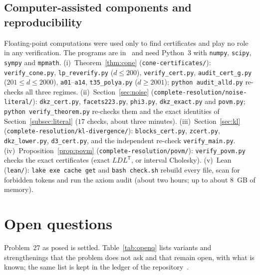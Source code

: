 \documentclass[11pt]{article}
\theoremstyle{remark}
\numberwithin{equation}{section}
\begin{document}
\subsection{Computer-assisted components and reproducibility}\label{subsec:computer}
\begin{sloppypar}
Floating-point computations were used only to find certificates and play no role in any verification. The programs are
in~\cite{repo} and need Python~3 with \texttt{numpy}, \texttt{scipy}, \texttt{sympy} and \texttt{mpmath}.
(i)~Theorem~\ref{thm:cone} (\texttt{cone-certificates/}): \texttt{verify\_cone.py}, \texttt{lp\_reverify.py}
($d\le200$), \texttt{verify\_cert.py}, \texttt{audit\_cert\_g.py} ($201\le d\le2000$), \texttt{a01}--\texttt{a14},
\texttt{t35\_polya.py} ($d\ge2001$); \texttt{python audit\_alld.py} re-checks all three regimes.
(ii)~Section~\ref{sec:noise} (\texttt{complete-resolution/noise-literal/}): \texttt{dkz\_cert.py}, \texttt{facets223.py},
\texttt{phi3.py}, \texttt{dkz\_exact.py} and \texttt{povm.py}; \texttt{python verify\_theorem.py} re-checks them and the
exact identities of Section~\ref{subsec:literal} ($17$ checks, about three minutes).
(iii)~Section~\ref{sec:kl} (\texttt{complete-resolution/kl-divergence/}): \texttt{blocks\_cert.py}, \texttt{zcert.py},
\texttt{dkz\_lower.py}, \texttt{d3\_cert.py}, and the independent re-check \texttt{verify\_main.py}.
(iv)~Proposition~\ref{prop:povm} (\texttt{complete-resolution/povm/}): \texttt{verify\_povm.py} checks the exact
certificates (exact $LDL^{\mathsf T}$, or interval Cholesky).
(v)~Lean (\texttt{lean/}): \texttt{lake exe cache get} and \texttt{bash check.sh} rebuild every file, scan for
forbidden tokens and run the axiom audit (about two hours; up to about 8~GB of memory).
\end{sloppypar}

\section{Open questions}\label{sec:open}

Problem~27 as posed is settled. Table~\ref{tab:openq} lists variants and strengthenings that the problem does not ask
and that remain open, with what is known; the same list is kept in the ledger of the repository~\cite{repo}.
\end{document}
